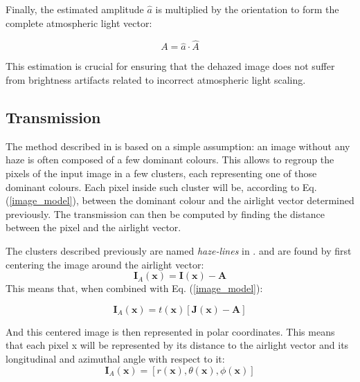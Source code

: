 \documentclass[conference]{IEEEtran}
\begin{document}
Finally, the estimated amplitude \( \hat{a} \) is multiplied by the orientation to form the complete atmospheric light vector:

\begin{equation}
\label{airlight}
A = \hat{a} \cdot \hat{A}
\end{equation}

This estimation is crucial for ensuring that the dehazed image does not suffer from brightness artifacts related to incorrect atmospheric light scaling.

\subsection{Transmission}
\label{EmmeranPart}
The method described in \cite{dehaze} is based on a simple assumption: an image without any haze is often composed of a few dominant colours. This allows to regroup the pixels of the input image in a few clusters, each representing one of those dominant colours. Each pixel inside such cluster will be, according to Eq. (\ref{image_model}), between the dominant colour and the airlight vector determined previously. The transmission can then be computed by finding the distance between the pixel and the airlight vector.\par
The clusters described previously are named \textit{haze-lines} in \cite{dehaze}. and are found by first centering the image around the airlight vector:
\begin{equation}
    \label{eq:centered_image}
    \mathbf{I}_A(\mathbf{x}) = \mathbf{I}(\mathbf{x}) - \mathbf{A}
\end{equation}
This means that, when combined with Eq. (\ref{image_model}):

\begin{equation}
    \label{eq:centered_image_model}
    \mathbf{I}_A(\mathbf{x}) = t(\mathbf{x}) \left[\mathbf{J}(\mathbf{x}) - \mathbf{A}\right]
\end{equation}

And this centered image is then represented in polar coordinates. This means that each pixel x will be represented by its distance to the airlight vector and its longitudinal and azimuthal angle with respect to it:
\begin{equation}
    \label{eq:polar_coordinates}
    \mathbf{I}_A(\mathbf{x}) = \left[r(\mathbf{x}), \theta(\mathbf{x}), \phi(\mathbf{x})\right]
\end{equation}
\end{document}
